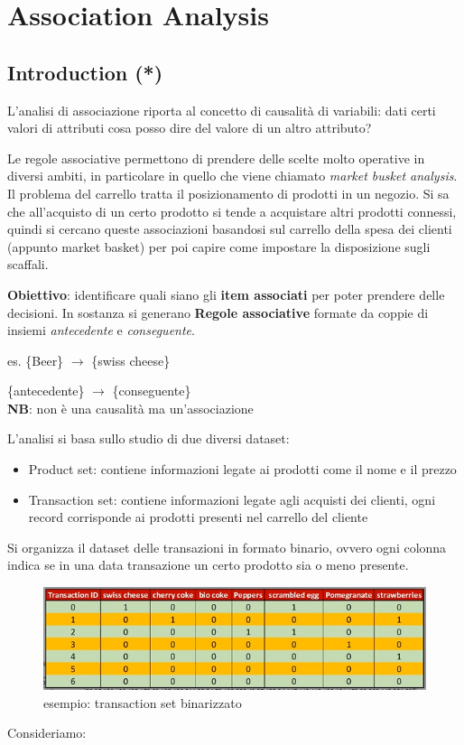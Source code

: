 

\section{Association Analysis}
\subsection{Introduction (*)}

L'analisi di associazione riporta al concetto di causalità di variabili: dati certi valori di attributi cosa posso dire del valore di un altro attributo?

Le regole associative permettono di prendere delle scelte molto operative in diversi ambiti, in particolare in quello che viene chiamato \textit{market busket analysis}. 
Il problema del carrello tratta il posizionamento di prodotti in un negozio. Si sa che all'acquisto di un certo prodotto si tende a acquistare altri prodotti connessi, quindi si cercano queste associazioni basandosi sul carrello della spesa dei clienti (appunto market basket) per poi capire come impostare la disposizione sugli scaffali.

\textbf{Obiettivo}: identificare quali siano gli \textbf{item associati} per poter prendere delle decisioni. In sostanza si generano \textbf{Regole associative} formate da coppie di insiemi \textit{antecedente} e \textit{conseguente}.

es. \{Beer\} $\rightarrow$ \{swiss cheese\} 

\quad \{antecedente\} $\rightarrow$ \{conseguente\}\\
\textbf{NB}: non \`e una causalit\`a ma un'associazione

L'analisi si basa sullo studio di due diversi dataset:
\begin{itemize}
	\item Product set: contiene informazioni legate ai prodotti come il nome e il prezzo
	\item Transaction set: contiene informazioni legate agli acquisti dei clienti, ogni record corrisponde ai prodotti presenti nel carrello del cliente
\end{itemize}

Si organizza il dataset delle transazioni in formato binario, ovvero ogni colonna indica se in una data transazione un certo prodotto sia o meno presente.

\begin{figure}[H]
	\centering
	\includegraphics[height=0.25 \linewidth]{association/pict/transaction_set_bin.png}
	\caption{esempio: transaction set binarizzato}
\end{figure}
\clearpage
\noindent
Consideriamo:


